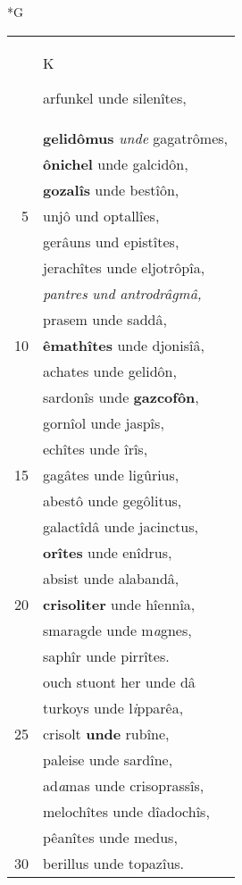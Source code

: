 \documentclass[8pt,a4paper,notitlepage]{article}
\begin{document}
\newpage
\begin{table}[ht]
\begin{minipage}[t]{0.5\linewidth}
\small
\begin{center}*G
\end{center}
\begin{tabular}{rl}
 & \begin{large}K\end{large}arfunkel unde silenîtes,\\ 
 & \textbf{gelidômus} \textit{unde} gagatrômes,\\ 
 & \textbf{ônichel} unde galcidôn,\\ 
 & \textbf{gozalîs} unde bestîôn,\\ 
5 & unjô und optallîes,\\ 
 & gerâuns und epistîtes,\\ 
 & jerachîtes unde eljotrôpîa,\\ 
 & \textit{pantres} \textit{und} \textit{antrodrâgmâ}\textit{,}\\ 
 & prasem unde saddâ,\\ 
10 & \textbf{êmathîtes} unde djonisîâ,\\ 
 & achates unde gelidôn,\\ 
 & sardonîs unde \textbf{gazcofôn},\\ 
 & gornîol unde jaspîs,\\ 
 & echîtes unde îrîs,\\ 
15 & gagâtes unde ligûrius,\\ 
 & abestô unde gegôlitus,\\ 
 & galactîdâ unde jacinctus,\\ 
 & \textbf{orîtes} unde enîdrus,\\ 
 & absist unde alabandâ,\\ 
20 & \textbf{crisoliter} unde hîennîa,\\ 
 & smaragde unde m\textit{a}gnes,\\ 
 & saphîr unde pirrîtes.\\ 
 & ouch stuont her unde dâ\\ 
 & turkoys unde l\textit{i}pparêa,\\ 
25 & crisolt \textbf{unde} rubîne,\\ 
 & paleise unde sardîne,\\ 
 & ad\textit{a}mas unde crisoprassîs,\\ 
 & melochîtes unde dîadochîs,\\ 
 & pêanîtes unde medus,\\ 
30 & berillus unde topazîus.\\ 

\end{tabular}
\end{minipage}
\end{table}
\end{document}
